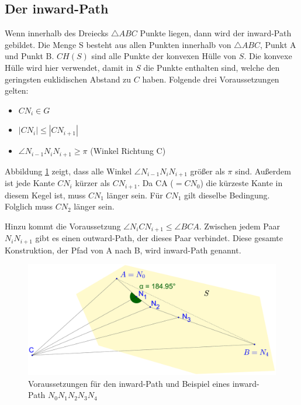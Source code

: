 \documentclass[a4paper,twoside]{IEEEtran}
\begin{document}
\subsection{Der inward-Path}
Wenn innerhalb des Dreiecks $\triangle{ABC} $ Punkte liegen, dann wird der inward-Path gebildet.
Die Menge S besteht aus allen Punkten innerhalb von $\triangle {ABC} $, Punkt A und Punkt B.
$CH(S) $ sind alle Punkte der konvexen Hülle von $S $. %
Die konvexe Hülle wird hier verwendet, damit in $S $ die Punkte enthalten sind, welche den geringsten euklidischen Abstand zu $C $ haben.
Folgende drei Voraussetzungen gelten:

\begin{itemize} 
	\item $CN_i \in G$
	\item $|CN_i| \leq |CN_{i+1}| $
	\item $\angle{N_{i-1}N_iN_{i+1}} \geq \pi $ (Winkel Richtung C)
\end{itemize} 


Abbildung \ref{fig:inward_path_prop} zeigt, dass alle Winkel $\angle{N_{i-1}N_iN_{i+1}} $ größer als $\pi $ sind.
Außerdem ist jede Kante $CN_i $ kürzer als $CN_{i+1}$. 
Da CA ($= CN_0 $) die kürzeste Kante in diesem Kegel ist, muss $CN_1 $ länger sein. 
Für $CN_1 $ gilt dieselbe Bedingung. 
Folglich muss $CN_2 $ länger sein.

Hinzu kommt die Voraussetzung $\angle{N_iCN_{i+1}} \leq \angle{BCA} $.
Zwischen jedem Paar $N_iN_{i+1} $ gibt es einen outward-Path, der dieses Paar verbindet.
Diese gesamte Konstruktion, der Pfad von A nach B, wird inward-Path genannt.

\begin{figure}[h!]
\centering
\includegraphics[width=1\linewidth]{inward_path_prop.eps}
\caption{Voraussetzungen für den inward-Path und Beispiel eines inward-Path $N_0N_1N_2N_3N_4 $}
\label{fig:inward_path_prop}
\end{figure}
\end{document}
